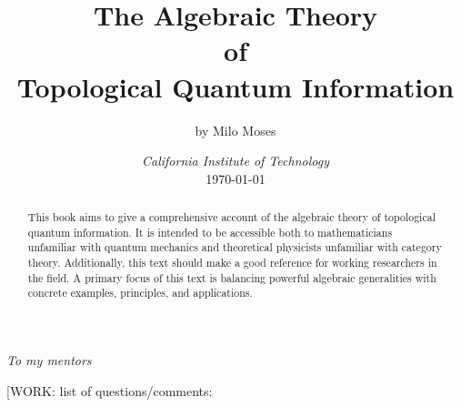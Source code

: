 \documentclass{article}
\title{The Algebraic Theory\\ of \\ Topological Quantum Information}
\author{by Milo Moses}
\date{\textit{California Institute of Technology} \\ [2ex] \today}
\theoremstyle{definition}
\newcommand{\0}{\left|0\right>}
\newcommand{\1}{\left|1\right>}
\numberwithin{figure}{section}
\begin{document}
\maketitle


\begin{abstract}
This book aims to give a comprehensive account of the algebraic theory of topological quantum information. It is intended to be accessible both to mathematicians unfamiliar with quantum mechanics and theoretical physicists unfamiliar with category theory. Additionally, this text should make a good reference for working researchers in the field. A primary focus of this text is balancing powerful algebraic generalities with concrete examples, principles, and applications.
\end{abstract}

\newpage

\vspace*{\fill}
\large\textit{To my mentors} \normalsize	
\vspace*{\fill}

\newpage



\newpage

\tableofcontents















\appendix






[WORK: list of questions/comments:
\end{document}
